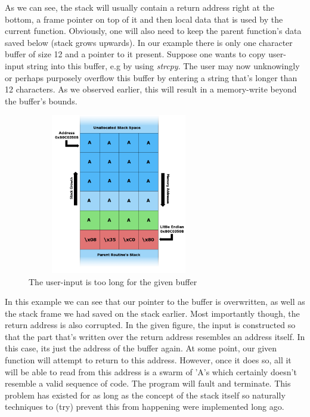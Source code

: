 \documentclass[10pt,twocolumn,a4paper]{article}
\begin{document}
As we can see, the stack will usually contain a return address right at the bottom, a frame pointer on top of it and then local data that is used by the current function.
Obviously, one will also need to keep the parent function's data saved below (stack grows upwards).
In our example there is only one character buffer of size 12 and a pointer to it present.
Suppose one wants to copy user-input string into this buffer, e.g by using \emph{strcpy}.
The user may now unknowingly or perhaps purposely overflow this buffer by entering a string that's longer than 12 characters.
As we observed earlier, this will result in a memory-write beyond the buffer's bounds. 
\begin{figure}[htbp]
	\begin{center}
		\includegraphics[height=7cm,width=8cm]{fig/Stack_Overflow2}
		\caption{The user-input is too long for the given buffer}
	\end{center}
\end{figure}
\newline 
In this example we can see that our pointer to the buffer is overwritten, as well as the stack frame we had saved on the stack earlier.
Most importantly though, the return address is also corrupted.
In the given figure, the input is constructed so that the part that's written over the return address resembles an address itself.
In this case, its just the address of the buffer again.
At some point, our given function will attempt to return to this address.
However, once it does so, all it will be able to read from this address is a swarm of  'A's which certainly doesn't resemble a valid sequence of code.
The program will fault and terminate.
This problem has existed for as long as the concept of the stack itself so naturally techniques to (try) prevent this from happening were implemented long ago.
\end{document}
